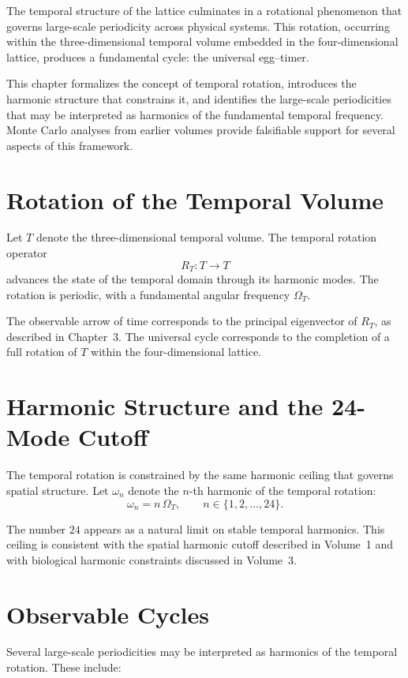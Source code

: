 \documentclass[11pt, letterpaper, openany]{book}
\begin{document}
The temporal structure of the lattice culminates in a rotational phenomenon 
that governs large-scale periodicity across physical systems. 
This rotation, occurring within the three-dimensional temporal volume embedded 
in the four-dimensional lattice, produces a fundamental cycle: the universal 
egg--timer. 

This chapter formalizes the concept of temporal rotation, introduces the 
harmonic structure that constrains it, and identifies the large-scale 
periodicities that may be interpreted as harmonics of the fundamental 
temporal frequency. Monte Carlo analyses from earlier volumes provide 
falsifiable support for several aspects of this framework.

\section{Rotation of the Temporal Volume}

Let $T$ denote the three-dimensional temporal volume. 
The temporal rotation operator
\[
R_T : T \rightarrow T
\]
advances the state of the temporal domain through its harmonic modes. 
The rotation is periodic, with a fundamental angular frequency $\Omega_T$.

The observable arrow of time corresponds to the principal eigenvector of 
$R_T$, as described in Chapter~3. 
The universal cycle corresponds to the completion of a full rotation of $T$ 
within the four-dimensional lattice.

\section{Harmonic Structure and the 24-Mode Cutoff}

The temporal rotation is constrained by the same harmonic ceiling that governs 
spatial structure. 
Let $\omega_n$ denote the $n$-th harmonic of the temporal rotation:
\[
\omega_n = n \, \Omega_T, \qquad n \in \{1, 2, \dots, 24\}.
\]

The number $24$ appears as a natural limit on stable temporal harmonics. 
This ceiling is consistent with the spatial harmonic cutoff described in 
Volume~1 and with biological harmonic constraints discussed in Volume~3.

\section{Observable Cycles}

Several large-scale periodicities may be interpreted as harmonics of the 
temporal rotation. These include:
\end{document}
